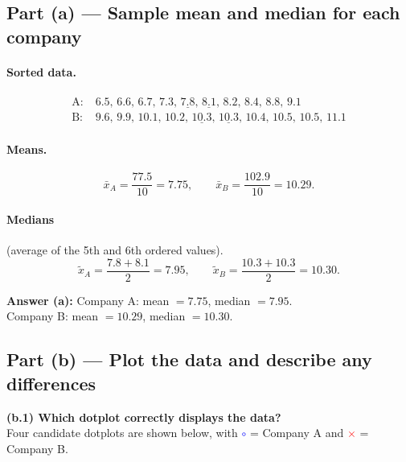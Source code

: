 \documentclass[11pt]{article}
\begin{document}
\subsection*{Part (a) — Sample mean and median for each company}

\paragraph{Sorted data.}
\[
\begin{aligned}
\text{A}:\;& 6.5,\,6.6,\,6.7,\,7.3,\,\underline{7.8},\,\underline{8.1},\,8.2,\,8.4,\,8.8,\,9.1\\
\text{B}:\;& 9.6,\,9.9,\,10.1,\,10.2,\,\underline{10.3},\,\underline{10.3},\,10.4,\,10.5,\,10.5,\,11.1
\end{aligned}
\]

\paragraph{Means.}
\[
\bar{x}_A=\frac{77.5}{10}=7.75,\qquad \bar{x}_B=\frac{102.9}{10}=10.29 .
\]

\paragraph{Medians} (average of the 5th and 6th ordered values).
\[
\tilde{x}_A=\frac{7.8+8.1}{2}=7.95,\qquad \tilde{x}_B=\frac{10.3+10.3}{2}=10.30 .
\]

\begin{answerbox}
\textbf{Answer (a):}\quad
Company A: mean $=7.75$, median $=7.95$.\\
Company B: mean $=10.29$, median $=10.30$.
\end{answerbox}

\subsection*{Part (b) — Plot the data and describe any differences}

\noindent
\textbf{(b.1) Which dotplot correctly displays the data?}\\
Four candidate dotplots are shown below, with
\textcolor{blue}{$\circ$} = Company A and \textcolor{red}{$\times$} = Company B.
\end{document}
